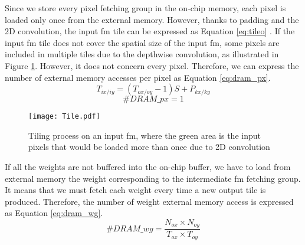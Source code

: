 Since we store every pixel fetching group in the on-chip memory, each pixel is loaded only once from the external memory. However, thanks to padding and the 2D convolution, the input \acrshort{fm} tile can be expressed as Equation \eqref{eq:tileo} \cite{ma_optimizing_2018}. If the input \acrshort{fm} tile does not cover the spatial size of the input \acrshort{fm}, some pixels are included in multiple tiles due to the depthwise convolution, as illustrated in Figure \ref{fig:tilei}. However, it does not concern every pixel. Therefore, we can express the number of external memory accesses per pixel as Equation \eqref{eq:dram_px}.
%
\begin{equation}
    T_{ix/iy} = \left( T_{ox/oy} - 1\right) S + P_{kx/ky}
    \label{eq:tileo}
\end{equation}
\begin{equation}
    \#DRAM\_px = 1
    \label{eq:dram_px}
\end{equation}
%
\begin{figure}[H]
    \centering
    \texttt{[image: Tile.pdf]}
    \caption{Tiling process on an input \acrshort{fm}, where the green area is the input pixels that would be loaded more than once due to 2D convolution}
    \label{fig:tilei}
\end{figure}
%
If all the weights are not buffered into the on-chip buffer, we have to load from external memory the weight corresponding to the intermediate \acrshort{fm} fetching group. It means that we must fetch each weight every time a new output tile is produced. Therefore, the number of weight external memory access is expressed as Equation \eqref{eq:dram_wg}.
%
\begin{equation}
    \#DRAM\_wg = \frac{N_{ox} \times N_{oy}}{T_{ox} \times T_{oy}}
    \label{eq:dram_wg}
\end{equation}
%
